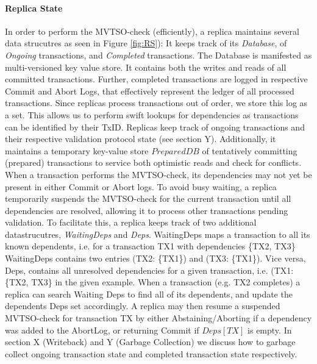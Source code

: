 \paragraph{Replica State}
In order to perform the MVTSO-check (efficiently), a replica maintains several data strucutres as seen in Figure \ref{fig:RS}): It keeps track of its \textit{Database}, of \textit{Ongoing} transactions, and \textit{Completed} transactions. The Database is manifested as multi-versioned key value store. It contains both the writes and reads of all committed transactions.
Further, completed transactions are logged in respective Commit and Abort Logs, that effectively represent the ledger of all processed transactions. Since replicas process transactions out of order, we store this log as a set. This allows us to perform swift lookups for dependencies as transactions can be identified by their TxID. 
Replicas keep track of ongoing transactions and their respective validation protocol state (see section Y). Additionally, it maintains a temporary key-value store $PreparedDB$ of tentatively committing (prepared) transactions to service both optimistic reads and check for conflicts. 
When a transaction performs the MVTSO-check, its dependencies may not yet be present in either Commit or Abort logs. To avoid busy waiting, a replica temporarily suspends the MVTSO-check for the current transaction until all dependencies are resolved, allowing it to process other transactions pending validation. To facilitate this, a replica keeps track of two additional datastrucutres, \textit{WaitingDeps} and \textit{Deps}. WaitingDeps maps a transaction to all its known dependents, i.e. for a transaction TX1 with dependencies \{TX2, TX3\} WaitingDeps contains two entries (TX2: \{TX1\}) and (TX3: \{TX1\}). Vice versa, Deps, contains all unresolved dependencies for a given transaction, i.e. (TX1: \{TX2, TX3\} in the given example. When a transaction (e.g. TX2 completes) a replica can search Waiting Deps to find all of its dependents, and update the dependents Deps set accordingly. A replica may then resume a suspended MVTSO-check for transaction TX by either Abstaining/Aborting if a dependency was added to the AbortLog, or returning Commit if $Deps[TX]$ is empty.
In section X (Writeback) and Y (Garbage Collection) we discuss how to garbage collect ongoing transaction state and completed transaction state respectively. 


